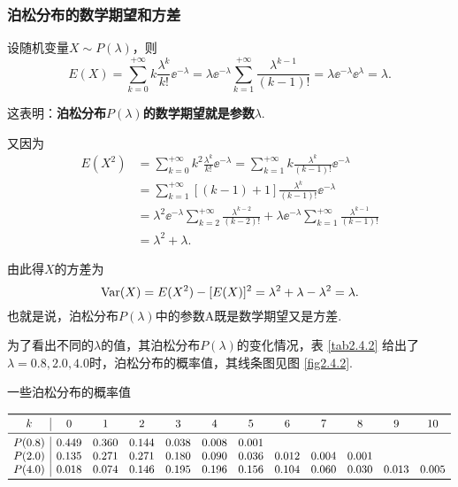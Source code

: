 \subsubsection{泊松分布的数学期望和方差}
设随机变量$X\sim P(\lambda)$，则
\[
  E(X) = \sum_{k=0}^{+\infty} k\frac{\lambda^k}{k!}\ee^{-\lambda} = \lambda\ee^{-\lambda}
  \sum_{k=1}^{+\infty}\frac{\lambda^{k-1}}{(k-1)!} = \lambda\ee^{-\lambda} \ee^\lambda = \lambda.
\]

这表明：\textbf{泊松分布$P(\lambda)$的数学期望就是参数$\lambda$}.

又因为
\begin{align*}
  E(X^2) & = \sum_{k=0}^{+\infty} k^2\frac{\lambda^k}{k!}\ee^{-\lambda} =
    \sum_{k=1}^{+\infty}k\frac{\lambda^k}{(k-1)!}\ee^{-\lambda} \\
    & = \sum_{k=1}^{+\infty}[(k-1)+1]\frac{\lambda^k}{(k-1)!}\ee^{-\lambda} \\
    & = \lambda^2\ee^{-\lambda} \sum_{k=2}^{+\infty}\frac{\lambda^{k-2}}{(k-2)!} +
      \lambda\ee^{-\lambda}
    \sum_{k=1}^{+\infty}\frac{\lambda^{k-1}}{(k-1)!} \\
    & = \lambda^2 + \lambda.
\end{align*}

由此得$X$的方差为
\[
  \operatorname{Var}(X) = E(X^2) - [E(X)]^2 = \lambda^2 + \lambda - \lambda^2 = \lambda.
\]
也就是说，泊松分布$P(\lambda)$中的参数A既是数学期望又是方差.

为了看出不同的$\lambda$的值，其泊松分布$P(\lambda)$的变化情况，表 \ref{tab2.4.2} 给出了$\lambda=
0.8,2.0,4.0$时，泊松分布的概率值，其线条图见图 \ref{fig2.4.2}.

\begin{table}[!ht]
  \caption{一些泊松分布的概率值\label{tab2.4.2}}
  \[
    \begin{array}{c|*{11}{c}}
      \toprule
        k & 0 & 1 & 2 & 3 & 4 & 5 & 6 & 7 & 8 & 9 & 10 \\
      \midrule
        P(0.8) & 0.449 & 0.360 & 0.144 & 0.038 & 0.008 & 0.001 & & & & & \\
        P(2.0) & 0.135 & 0.271 & 0.271 & 0.180 & 0.090 & 0.036 & 0.012 & 0.004 & 0.001 &  &  \\
        P(4.0) & 0.018 & 0.074 & 0.146 & 0.195 & 0.196 & 0.156 & 0.104 & 0.060 & 0.030 & 0.013 & 0.005 \\
      \bottomrule
    \end{array}
  \]
\end{table}

